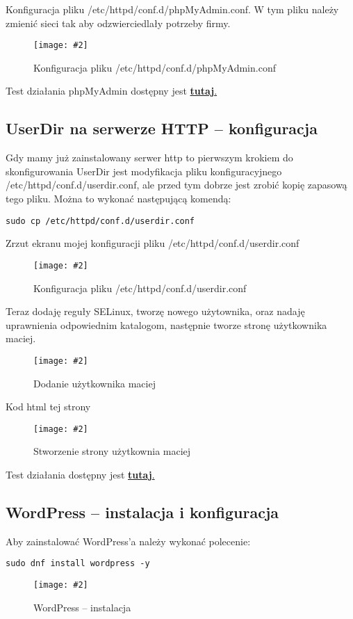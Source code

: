 \documentclass[a4paper]{article}
\newcommand*{\zdj}[2][\textwidth]{\texttt{[image: \#2]}}
\newcommand*{\fg}[4][!htb]{
      \begin{figure*}[#1]
            \zdj{#2}
            \caption[#4]{#3}
      \end{figure*}
}
\begin{document}
Konfiguracja pliku /etc/httpd/conf.d/phpMyAdmin.conf. W tym pliku należy zmienić sieci tak aby odzwierciedlały potrzeby firmy.
\fg{contents/configuration/phpMyAdmin/3.png}{Konfiguracja pliku /etc/httpd/conf.d/phpMyAdmin.conf}{Konfiguracja pliku /etc/httpd/conf.d/phpMyAdmin.conf}

Test działania phpMyAdmin dostępny jest \hyperref[fig:phpMyAdmin-test]{\textbf{tutaj}.}

\newpage
\subsection{UserDir na serwerze HTTP – konfiguracja}
Gdy mamy już zainstalowany serwer http to pierwszym krokiem do skonfigurowania UserDir jest modyfikacja pliku konfiguracyjnego /etc/httpd/conf.d/userdir.conf, ale przed tym dobrze jest zrobić kopię zapasową tego pliku. Można to wykonać następującą komendą:
\begin{Verbatim}[frame=single]
sudo cp /etc/httpd/conf.d/userdir.conf
\end{Verbatim}

\vspace*{-10pt}
Zrzut ekranu mojej konfiguracji pliku /etc/httpd/conf.d/userdir.conf
\vspace*{-10pt}
\fg{contents/configuration/UserDir/2.png}{Konfiguracja pliku /etc/httpd/conf.d/userdir.conf}{Konfiguracja pliku /etc/httpd/conf.d/userdir.conf}

\vspace*{-10pt}
Teraz dodaję reguły SELinux, tworzę nowego użytownika, oraz nadaję uprawnienia odpowiednim katalogom, następnie tworze stronę użytkownika maciej.
\vspace*{-5pt}
\fg{contents/configuration/UserDir/3.png}{Dodanie użytkownika maciej}{Dodanie użytkownika maciej}

\newpage
Kod html tej strony
\fg{contents/configuration/UserDir/4.png}{Stworzenie strony użytkownia maciej}{Stworzenie strony użytkownia maciej}

Test działania dostępny jest \hyperref[fig:UserDir-test]{\textbf{tutaj}.}

\subsection{WordPress – instalacja i konfiguracja}
Aby zainstalować WordPress'a należy wykonać polecenie:
\begin{Verbatim}[frame=single]
sudo dnf install wordpress -y
\end{Verbatim}
\fg{contents/configuration/wordpress/1.png}{WordPress – instalacja}{WordPress – instalacja}
\end{document}
